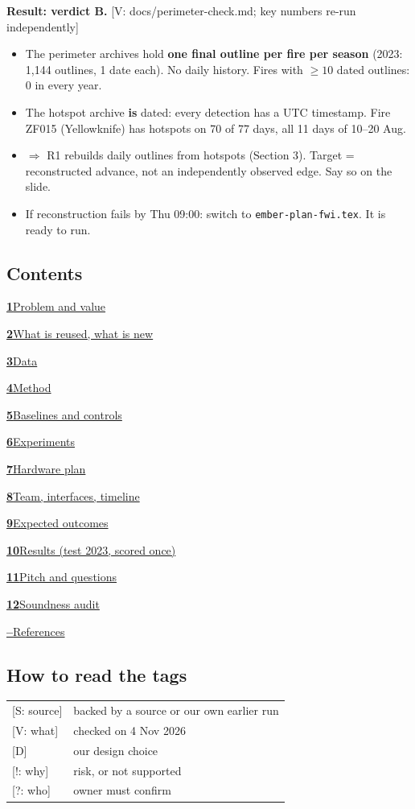 \documentclass[11pt,a4paper]{article}
\newcommand{\tagbox}[2]{{\footnotesize\color{#1}\textsf{[#2]}}}
\newcommand{\supp}[1]{\tagbox{ForestGreen!70!black}{S: #1}}  %
\newcommand{\veri}[1]{\tagbox{ForestGreen!70!black}{V: #1}}  %
\newcommand{\ours}{\tagbox{NavyBlue}{D}}                      %
\newcommand{\caut}[1]{\tagbox{BrickRed}{!: #1}}               %
\newcommand{\todo}[1]{\tagbox{Orange!85!black}{?: #1}}        %
\newcommand{\code}[1]{\texttt{\small #1}}
\newcommand{\tocsec}[2]{\par\noindent\hyperlink{section.#1}{\textbf{#1}\quad #2}\par}
\begin{document}
\begin{gate}
\textbf{Result: verdict B.} \veri{docs/perimeter-check.md; key numbers re-run independently}
\begin{itemize}
\item The perimeter archives hold \textbf{one final outline per fire per season} (2023: 1{,}144 outlines, 1 date
  each). No daily history. Fires with $\ge10$ dated outlines: 0 in every year.
\item The hotspot archive \textbf{is} dated: every detection has a UTC timestamp. Fire ZF015 (Yellowknife) has hotspots
  on 70 of 77 days, all 11 days of 10--20 Aug.
\item $\Rightarrow$ R1 rebuilds daily outlines from hotspots (Section 3). Target = reconstructed advance, not an
  independently observed edge. Say so on the slide.
\item If reconstruction fails by Thu 09:00: switch to \code{ember-plan-fwi.tex}. It is ready to run.
\end{itemize}
\end{gate}

\subsection*{Contents}
\tocsec{1}{Problem and value}
\tocsec{2}{What is reused, what is new}
\tocsec{3}{Data}
\tocsec{4}{Method}
\tocsec{5}{Baselines and controls}
\tocsec{6}{Experiments}
\tocsec{7}{Hardware plan}
\tocsec{8}{Team, interfaces, timeline}
\tocsec{9}{Expected outcomes}
\tocsec{10}{Results (test 2023, scored once)}
\tocsec{11}{Pitch and questions}
\tocsec{12}{Soundness audit}
\par\noindent\hyperlink{refs}{\textbf{--}\quad References}\par

\subsection*{How to read the tags}
\begin{center}\small
\begin{tabular}{@{}ll@{}}
\supp{source} & backed by a source or our own earlier run\\
\veri{what} & checked on 4 Nov 2026\\
\ours & our design choice\\
\caut{why} & risk, or not supported\\
\todo{who} & owner must confirm\\
\end{tabular}
\end{center}
\end{document}
